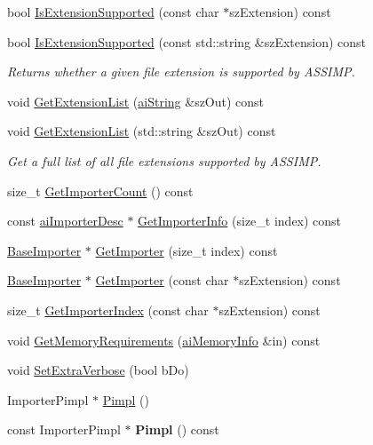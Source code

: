 \begin{DoxyCompactItemize}
\item 
bool \hyperlink{class_assimp_1_1_importer_af154ba007f649fcf034a10d6e9c3d4fa}{Is\+Extension\+Supported} (const char $\ast$sz\+Extension) const 
\item 
bool \hyperlink{class_assimp_1_1_importer_a5b01905366f5bf8d1f89d51f755bf7d2}{Is\+Extension\+Supported} (const std\+::string \&sz\+Extension) const 
\begin{DoxyCompactList}\small\item\em Returns whether a given file extension is supported by A\+S\+S\+I\+M\+P. \end{DoxyCompactList}\item 
void \hyperlink{class_assimp_1_1_importer_a8efc173c66857384ecb05ec1ecde9780}{Get\+Extension\+List} (\hyperlink{structai_string}{ai\+String} \&sz\+Out) const 
\item 
void \hyperlink{class_assimp_1_1_importer_a6ab684351c55e170de3c5b7d730b306d}{Get\+Extension\+List} (std\+::string \&sz\+Out) const 
\begin{DoxyCompactList}\small\item\em Get a full list of all file extensions supported by A\+S\+S\+I\+M\+P. \end{DoxyCompactList}\item 
size\+\_\+t \hyperlink{class_assimp_1_1_importer_ab3b292be7928540476b7aef8797e4fa1}{Get\+Importer\+Count} () const 
\item 
const \hyperlink{structai_importer_desc}{ai\+Importer\+Desc} $\ast$ \hyperlink{class_assimp_1_1_importer_a4878ce95e2ac3f61d29eba4de824adaa}{Get\+Importer\+Info} (size\+\_\+t index) const 
\item 
\hyperlink{class_assimp_1_1_base_importer}{Base\+Importer} $\ast$ \hyperlink{class_assimp_1_1_importer_ae7af99267a47b4aed733b369cd4cdb5c}{Get\+Importer} (size\+\_\+t index) const 
\item 
\hyperlink{class_assimp_1_1_base_importer}{Base\+Importer} $\ast$ \hyperlink{class_assimp_1_1_importer_ad5ed118104801538fe03a17f56dc2609}{Get\+Importer} (const char $\ast$sz\+Extension) const 
\item 
size\+\_\+t \hyperlink{class_assimp_1_1_importer_a1223a55dae60236ef3c566d8ac141ea7}{Get\+Importer\+Index} (const char $\ast$sz\+Extension) const 
\item 
void \hyperlink{class_assimp_1_1_importer_adc80b08ae1208d06342291d6a3abd24f}{Get\+Memory\+Requirements} (\hyperlink{classai_memory_info}{ai\+Memory\+Info} \&in) const 
\item 
void \hyperlink{class_assimp_1_1_importer_a91156db4533e658b4f7544f42141c4da}{Set\+Extra\+Verbose} (bool b\+Do)
\item 
Importer\+Pimpl $\ast$ \hyperlink{class_assimp_1_1_importer_ac112839f323a630f83395acb74746827}{Pimpl} ()
\item 
\hypertarget{class_assimp_1_1_importer_a6bf9560ac8b1353ae809ff1d99c9c661}{const Importer\+Pimpl $\ast$ {\bfseries Pimpl} () const }\label{class_assimp_1_1_importer_a6bf9560ac8b1353ae809ff1d99c9c661}

\end{DoxyCompactItemize}
